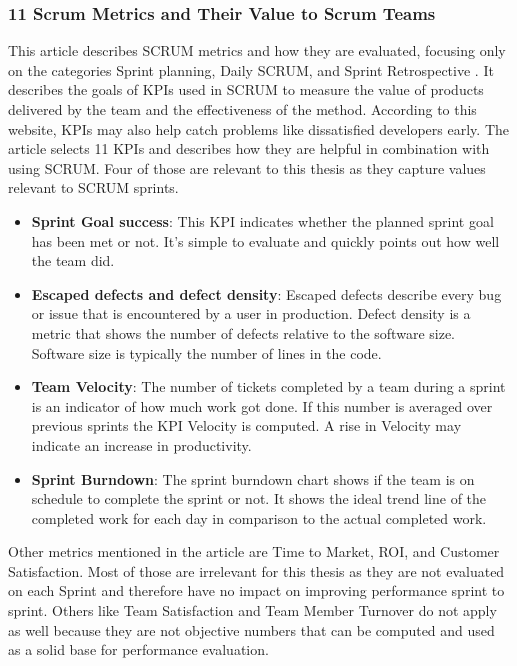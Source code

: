 \subsubsection*{11 Scrum Metrics and Their Value to Scrum Teams}
This article describes SCRUM metrics and how they are evaluated, 
focusing only on the categories Sprint planning, Daily SCRUM, 
and Sprint Retrospective \parencite{Sealights2023}. 
It describes the goals of KPIs used in SCRUM to measure the value of products 
delivered by the team and the effectiveness of the method. According to this website, 
KPIs may also help catch problems like dissatisfied developers early.
The article selects 11 KPIs and describes how they are helpful in combination with using SCRUM. 
Four of those are relevant to this thesis as they capture values relevant to SCRUM sprints.

\begin{itemize}
    \item \textbf{Sprint Goal success}:
    This KPI indicates whether the planned sprint goal has been met or not. It's simple to evaluate and quickly points out how well the team did.

    \item \textbf{Escaped defects and defect density}:
    Escaped defects describe every bug or issue that is encountered by a user in production. Defect density is a metric that shows the number of defects relative to the software size. Software size is typically the number of lines in the code.

    \item \textbf{Team Velocity}:
    The number of tickets completed by a team during a sprint is an indicator of how much work got done. If this number is averaged over previous sprints the KPI Velocity is computed. A rise in Velocity may indicate an increase in productivity.

    \item \textbf{Sprint Burndown}:
    The sprint burndown chart shows if the team is on schedule to complete the sprint or not. It shows the ideal trend line of the completed work for each day in comparison to the actual completed work.

\end{itemize}

Other metrics mentioned in the article are Time to Market, ROI, and Customer Satisfaction. Most of those are irrelevant for this thesis as they are not evaluated on each Sprint and therefore have no impact on improving performance sprint to sprint. Others like Team Satisfaction and Team Member Turnover do not apply as well because they are not objective numbers that can be computed and used as a solid base for performance evaluation.

